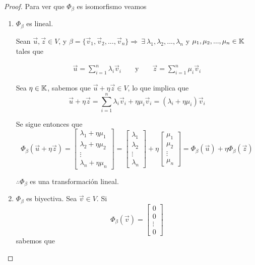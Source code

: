 \begin{proof}
    Para ver que $\Phi_{\beta}$ es isomorfismo veamos

    \begin{enumerate}
        \item $\Phi_{\beta}$ es lineal. 
        
        Sean $\vec{u},\vec{z} \in V$, y $\beta=\{\vec{v}_1,\vec{v}_2,...,\vec{v}_n\} \Rightarrow \: \exists \: \lambda_1,\lambda_2,...,\lambda_n$ y $\mu_1,\mu_2,...,\mu_n \in \mathbb{K}$ tales que 
        
        \begin{align*}
            \vec{u}=\sum_{i=1}^n\lambda_i\vec{v}_i && \text{ y } && \vec{z}=\sum_{i=1}^n\mu_i \vec{v}_i
        \end{align*}
        
        Sea $\eta \in \mathbb{K}$, sabemos que $\vec{u}+\eta\vec{z} \in V$, lo que implica que 
        $$\vec{u}+\eta\vec{z}=\sum_{i=1}^n\lambda_i\vec{v}_i+\eta\mu_i\vec{v}_i=(\lambda_i+\eta\mu_i)\vec{v}_i$$
        
        Se sigue entonces que 
        $$\Phi_{\beta}(\vec{u}+\eta \vec{z})=\begin{bmatrix}
        \lambda_1+\eta \mu_1 \\
        \lambda_2+\eta \mu_2 \\
        \vdots \\
        \lambda_n + \eta \mu_n
    \end{bmatrix}=\begin{bmatrix}
        \lambda_1 \\
        \lambda_2 \\
        \vdots \\
        \lambda_n
    \end{bmatrix}+\eta \begin{bmatrix}
        \mu_1 \\
        \mu_2 \\
        \vdots \\
        \mu_n
    \end{bmatrix}=\Phi_{\beta}(\vec{u})+\eta \Phi_{\beta}(\vec{z})$$ 
    
    $\therefore \Phi_{\beta}$ es una transformación lineal. 
        \item $\Phi_{\beta}$ es biyectiva. Sea $\vec{v} \in V$. Si $$\Phi_{\beta}(\vec{v})=\begin{bmatrix}
        0 \\
        0 \\
        \vdots \\
        0
    \end{bmatrix}$$ 
    sabemos que 
    

\end{enumerate}
\end{proof}
